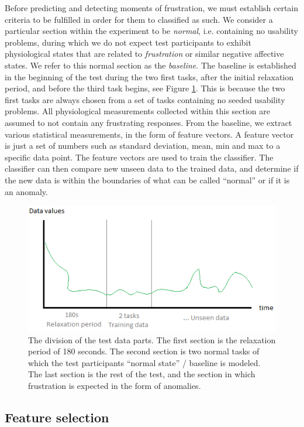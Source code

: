 Before predicting and detecting moments of frustration, we must establish certain criteria to be fulfilled in order for
them to classified as such.  We consider a particular section within the experiment to be \textit{normal},
i.e. containing no usability problems, during which we do not expect test participants to exhibit physiological states
that are related to \textit{frustration} or similar negative affective states. We refer to this normal section as the
\textit{baseline}. The baseline is established in the beginning of the test during the two first tasks, after the
initial relaxation period, and before the third task begins, see Figure \ref{[FIGURE] Data Sections}. This is because the two first tasks are always chosen from
a set of tasks containing no seeded usability problems. All physiological measurements collected within this section are assumed to not contain any frustrating responses. From the baseline, we extract various statistical measurements, in the form of
feature vectors. A feature vector is just a set of numbers such as standard deviation, mean, min and max to a specific data point. 
The feature vectors are used to train the classifier. The classifier can then compare new unseen data to the trained data, and determine if the new data is within the boundaries of what can be called ``normal'' or if it is an anomaly.  
\begin{figure}
    \centering
  \includegraphics[width=0.95\columnwidth]{graphics/rest_period_training_data.png}
    \caption{The division of the test data parts. The first section is the relaxation period of 180 seconds. The second section is two normal tasks of which the test participants ``normal state'' / baseline is modeled. The last section is the rest of the test, and the section in which frustration is expected in the form of anomalies. }
    \label{[FIGURE] Data Sections}
\end{figure}
\subsection{Feature selection}

